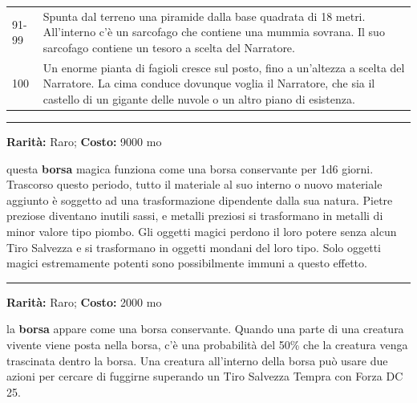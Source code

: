 \begin{multicols}{2}
\begin{tabularx}{0.50\textwidth}{lX}
91-99 &Spunta dal terreno una piramide dalla base quadrata di 18 metri. All'interno c'è un sarcofago che contiene una mummia sovrana. Il suo sarcofago contiene un tesoro a scelta del Narratore.\\
100 &Un enorme pianta di fagioli cresce sul posto, fino a un'altezza a scelta del Narratore. La cima conduce dovunque voglia il Narratore, che sia il castello di un gigante delle nuvole o un altro piano di esistenza.
\end{tabularx}
%


\medskip

\smallskip\noindent\rule{\linewidth}{2pt}  \hypertarget{Borsadell'Annullamento}{}\smallskip{}\noindent\label{Borsadell'Annullamento}

\textbf{Rarità:} Raro; \textbf{Costo:} 9000 mo

questa \textbf{borsa} magica funziona come una borsa conservante per 1d6 giorni. Trascorso questo periodo, tutto il materiale al suo interno o nuovo materiale aggiunto è soggetto ad una trasformazione dipendente dalla sua natura. Pietre preziose diventano inutili sassi, e metalli preziosi si trasformano in metalli di minor valore tipo piombo. Gli oggetti magici perdono il loro potere senza alcun Tiro Salvezza e si trasformano in oggetti mondani del loro tipo. Solo oggetti magici estremamente potenti sono possibilmente immuni a questo effetto.

\smallskip\noindent\rule{\linewidth}{2pt}  \hypertarget{BorsaDivorante}{}\smallskip{}\noindent\label{BorsaDivorante}

\textbf{Rarità:} Raro; \textbf{Costo:} 2000 mo

la \textbf{borsa} appare come una borsa conservante. Quando una parte di una creatura vivente viene posta nella borsa, c'è una probabilità del 50\% che la creatura venga trascinata dentro la borsa. Una creatura all'interno della borsa può usare due azioni per cercare di fuggirne superando un Tiro Salvezza Tempra con Forza DC 25.


\end{multicols}
